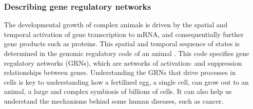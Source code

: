 \documentclass[../main.tex]{subfiles}
\begin{document}
\subsubsection{Describing gene regulatory networks}

The developmental growth of complex animals is driven by the spatial and temporal activation of gene transcription to mRNA, and consequentially further gene products such as proteins.
This spatial and temporal sequence of states is determined in the genomic regulatory code of an animal \cite{bolouri2002modeling, kuhn2009monte}.
This code specifies gene regulatory networks (GRNs), which are networks of activation- and suppression relationships between genes.
Understanding the GRNs that drive processes in cells is key to understanding how a fertilized egg, a single cell, can grow out to an animal, a large and complex symbiosis of billions of cells.
It can also help us understand the mechanisms behind some human diseases, such as cancer.
\end{document}
